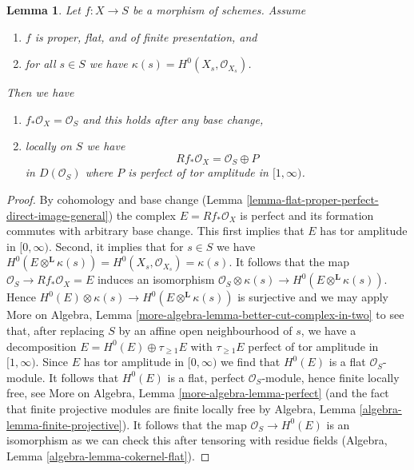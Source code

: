 \documentclass{stacks-project}
\theoremstyle{plain}
\newtheorem{lemma}[subsection]{Lemma}
\theoremstyle{definition}
\theoremstyle{remark}
\numberwithin{equation}{subsection}
\begin{document}
\begin{lemma}
\label{lemma-proper-flat-h0}
Let $f : X \to S$ be a morphism of schemes. Assume
\begin{enumerate}
\item $f$ is proper, flat, and of finite presentation, and
\item for all $s \in S$ we have $\kappa(s) = H^0(X_s, \mathcal{O}_{X_s})$.
\end{enumerate}
Then we have
\begin{enumerate}
\item[(a)] $f_*\mathcal{O}_X = \mathcal{O}_S$ and
this holds after any base change,
\item[(b)] locally on $S$ we have
$$
Rf_*\mathcal{O}_X = \mathcal{O}_S \oplus P
$$
in $D(\mathcal{O}_S)$
where $P$ is perfect of tor amplitude in $[1, \infty)$.
\end{enumerate}
\end{lemma}

\begin{proof}
By cohomology and base change
(Lemma \ref{lemma-flat-proper-perfect-direct-image-general})
the complex $E = Rf_*\mathcal{O}_X$
is perfect and its formation commutes with arbitrary base change.
This first implies that $E$ has tor amplitude in $[0, \infty)$.
Second, it implies that for $s \in S$ we have
$H^0(E \otimes^\mathbf{L} \kappa(s)) =
H^0(X_s, \mathcal{O}_{X_s}) = \kappa(s)$.
It follows that the map $\mathcal{O}_S \to Rf_*\mathcal{O}_X = E$
induces an isomorphism
$\mathcal{O}_S \otimes \kappa(s) \to H^0(E \otimes^\mathbf{L} \kappa(s))$.
Hence $H^0(E) \otimes \kappa(s) \to H^0(E \otimes^\mathbf{L} \kappa(s))$
is surjective and we may apply
More on Algebra, Lemma \ref{more-algebra-lemma-better-cut-complex-in-two}
to see that, after replacing $S$ by an affine open neighbourhood of $s$,
we have a decomposition $E = H^0(E) \oplus \tau_{\geq 1}E$
with $\tau_{\geq 1}E$ perfect of tor amplitude in $[1, \infty)$.
Since $E$ has tor amplitude in $[0, \infty)$ we find that
$H^0(E)$ is a flat $\mathcal{O}_S$-module.
It follows that $H^0(E)$ is a flat, perfect $\mathcal{O}_S$-module,
hence finite locally free, see
More on Algebra, Lemma \ref{more-algebra-lemma-perfect}
(and the fact that finite projective modules are finite locally free by
Algebra, Lemma \ref{algebra-lemma-finite-projective}).
It follows that the map $\mathcal{O}_S \to H^0(E)$ is
an isomorphism as we can check this after tensoring with
residue fields (Algebra, Lemma \ref{algebra-lemma-cokernel-flat}).
\end{proof}
\end{document}
